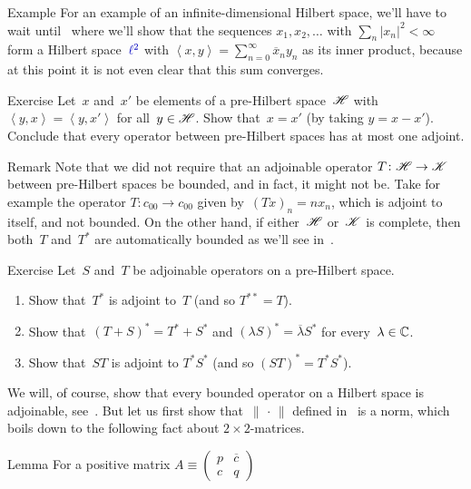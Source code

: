 \documentclass[a]{subfiles}
\begin{document}
\begin{parsec}[hilb]
\begin{point}{Example}
For an example
of an infinite-dimensional Hilbert
space,
we'll have to wait until~
where 
we'll show
that the sequences $x_1,x_2,\dotsc$
with $\sum_n \left|x_n\right|^2<\infty$
form a Hilbert space~$\Define{\ell^2}$%
with $\left<x,y\right>=\sum_{n=0}^\infty \overline{x}_ny_n$
as its inner product,
because at this point it is not
even clear that this sum converges.
\end{point}
\begin{point}{Exercise}%
Let~$x$ and~$x'$ be elements of a pre-Hilbert space~$\mathscr{H}$
with $\left<y,x\right>=\left<y,x'\right>$
for all~$y\in\mathscr{H}$.
Show that~$x=x'$ (by taking $y=x-x'$).
Conclude that every operator between pre-Hilbert spaces
has at most one adjoint.
\begin{point}{Remark}%
Note that we did not require that
an adjoinable operator $T\colon \mathscr{H}\to\mathscr{K}$
between pre-Hilbert spaces be bounded,
and in fact, it might not be.
Take for example
the operator
$T\colon c_{00}\to c_{00}$
given by~$(T x)_n = nx_n$,
which is adjoint to itself,
and not bounded.
On the other hand,
if either~$\mathscr{H}$ or~$\mathscr{K}$ is complete,
then both~$T$ and~$T^*$ are automatically bounded
as we'll see in~.
\end{point}
\end{point}
\begin{point}{Exercise}%
Let~$S$ and~$T$ be adjoinable operators on a pre-Hilbert space.
\begin{enumerate}
\item
Show that~$T^*$ is adjoint to~$T$ (and so $T^{**}=T$).
\item
Show that~$(T+S)^*=T^*+S^*$
and $(\lambda S)^*=\overline{\lambda}S^*$
for every~$\lambda\in \mathbb{C}$.
\item
Show that~$ST$ is adjoint to $T^*S^*$ (and so $(ST)^*=T^*S^*$).
\end{enumerate}
We will, of course, show
that every bounded operator on a Hilbert space is adjoinable,
see~.
But let us first show that~$\|\,\cdot\,\|$
defined in~ is a norm,
which boils down to the following fact
about  $2\times 2$-matrices.
\end{point}
\begin{point}{Lemma}%
For a positive matrix $A\equiv 
\left(\begin{smallmatrix}p & \overline{c} \\ c & q\end{smallmatrix}\right)$

\end{point}
\end{parsec}
\end{document}
